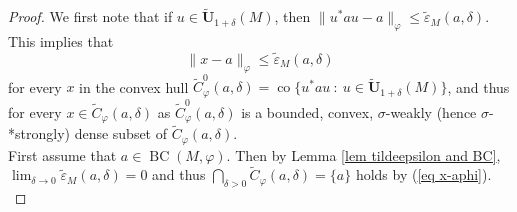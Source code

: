 \documentclass[12pt]{amsart}
\theoremstyle{definition}
\newcommand{\ep}{\varepsilon}
\def\BC{\operatorname{BC}}
\begin{document}
\begin{proof}
    We first note that if $u\in \tilde{\mathbf{U}}_{1+\delta}(M)$, then $\|u^*au-a\|_{\varphi}\le \tilde{\ep}_{M}(a,\delta)$. This implies that 
    \begin{equation}\|x-a\|_{\varphi}\le \tilde{\ep}_{M}(a,\delta)\label{eq x-aphi}
    \end{equation}
    for every $x$ in the convex hull $\widetilde{C}_{\varphi}^0(a,\delta)=\operatorname{co}\{u^*au \ : \  u\in \tilde{\mathbf{U}}_{1+\delta}(M)\}$, and thus for every $x\in \widetilde{C}_{\varphi}(a,\delta)$ as $\widetilde{C}_{\varphi}^0(a,\delta)$ is a bounded, convex, $\sigma$-weakly (hence $\sigma$-*strongly) dense subset of $\widetilde{C}_{\varphi}(a,\delta)$.\\
    
    First assume that $a\in \BC(M,\varphi)$. Then by Lemma \ref{lem tildeepsilon and BC}, $\displaystyle \lim_{\delta\to 0}\tilde{\ep}_M(a,\delta)=0$ and thus $\bigcap_{\delta>0}\widetilde{C}_{\varphi}(a,\delta)=\{a\}$  holds by (\ref{eq x-aphi}).\\
    

\end{proof}
\end{document}
